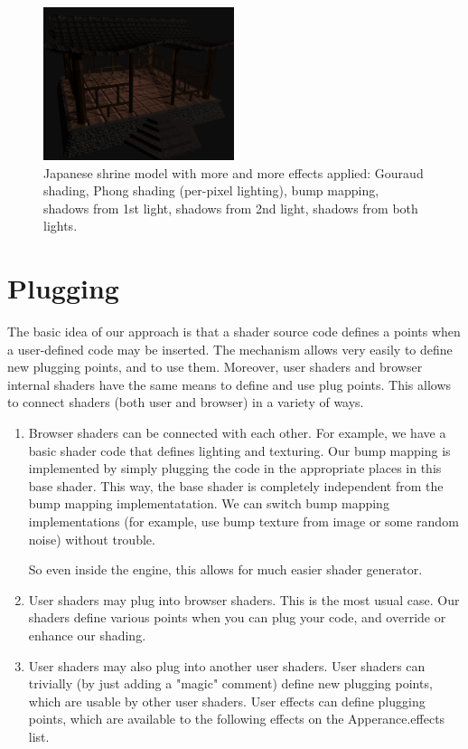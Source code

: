 \documentclass{acmsiggraph}                     %
\newenvironment{myenumerate}
{\begin{enumerate}
  \setlength{\itemsep}{0pt}
  \setlength{\parskip}{0pt}
  \setlength{\parsep}{0pt}}
{\end{enumerate}}
\begin{document}
\begin{figure}[t]
  \includegraphics[width=2.2in]{rhan_shrine_5_everything}
  \caption{Japanese shrine model with more and more effects applied: Gouraud shading,
Phong shading (per-pixel lighting), bump mapping, shadows from 1st light,
shadows from 2nd light, shadows from both lights.}
\end{figure}

\section{Plugging}

The basic idea of our approach is that a shader source code defines
a points when a user-defined code may be inserted. The mechanism
allows very easily to define new plugging points, and to use
them. Moreover, user shaders and browser internal shaders have the
same means to define and use plug points. This allows to connect
shaders (both user and browser) in a variety of ways.

\begin{myenumerate}
\itemsep 0pt
\item Browser shaders can be connected with each other. For example, we
have a basic shader code that defines lighting and texturing. Our bump
mapping is implemented by simply plugging the code in the appropriate
places in this base shader. This way, the base shader is completely
independent from the bump mapping implementatation. We can switch bump
mapping implementations (for example, use bump texture from image or
some random noise) without trouble.

So even inside the engine, this allows for much easier shader generator.

\item User shaders may plug into browser shaders. This is the most usual
case. Our shaders define various points when you can plug your code,
and override or enhance our shading.

\item User shaders may also plug into another user shaders. User shaders
can trivially (by just adding a "magic" comment) define new plugging
points, which are usable by other user shaders. User effects can
define plugging points, which are available to the following effects
on the Apperance.effects list.

\end{myenumerate}
\end{document}
